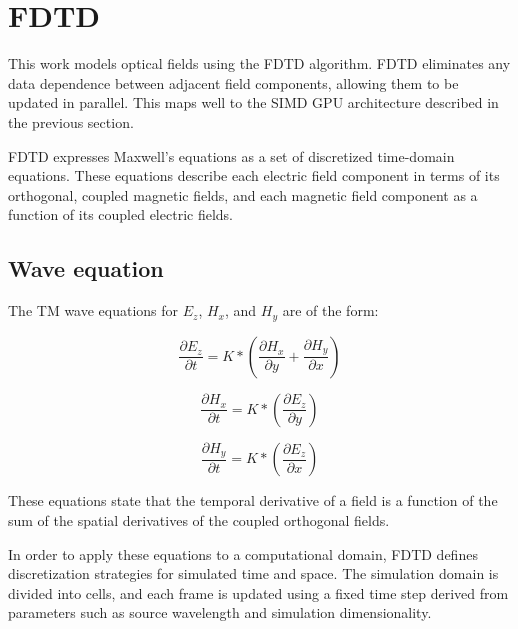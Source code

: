
\chapter{FDTD} \label{ch:fdtd}

This work models optical fields using the FDTD algorithm. FDTD eliminates any data dependence between adjacent field components, allowing them to be updated in parallel. This maps well to the SIMD GPU architecture described in the previous section. 

FDTD expresses Maxwell's equations as a set of discretized time-domain equations\cite{Yee}. These equations describe each electric field component in terms of its orthogonal, coupled magnetic fields, and each magnetic field component as a function of its coupled electric fields.


\section{Wave equation}

The TM wave equations for  $E_z$, $H_x$, and $H_y$ are of the form:

\begin{equation} \label{eq:waveequation} 
\frac{\partial E_z}{\partial t} = K * (\frac{\partial H_x}{\partial y} + \frac{\partial H_y}{\partial x})
\end{equation}

\begin{equation}
\frac{\partial H_x}{\partial t} = K * (\frac{\partial E_z}{\partial y})
\end{equation}

\begin{equation}
\frac{\partial H_y}{\partial t} = K * (\frac{\partial E_z}{\partial x})
\end{equation}

These equations state that the temporal derivative of a field is a function of the sum of the spatial derivatives of the coupled orthogonal fields.

In order to apply these equations to a computational domain, FDTD defines discretization strategies for simulated time and space. The simulation domain is divided into cells, and each frame is updated using a fixed time step derived from parameters such as source wavelength and simulation dimensionality.

